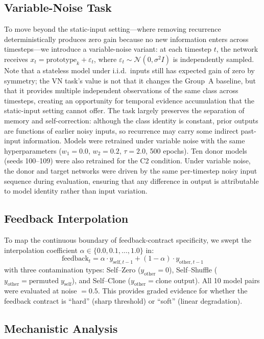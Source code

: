 \documentclass[10pt]{article}
\begin{document}
\subsection{Variable-Noise Task}
\label{sec:vn}

To move beyond the static-input setting---where removing recurrence deterministically produces zero gain because no new information enters across timesteps---we introduce a variable-noise variant: at each timestep $t$, the network receives $x_t = \text{prototype}_k + \varepsilon_t$, where $\varepsilon_t \sim \mathcal{N}(0, \sigma^2 I)$ is independently sampled. Note that a stateless model under i.i.d.\ inputs still has expected gain of zero by symmetry; the VN task's value is not that it changes the Group~A baseline, but that it provides multiple independent observations of the same class across timesteps, creating an opportunity for temporal evidence accumulation that the static-input setting cannot offer. The task largely preserves the separation of memory and self-correction: although the class identity is constant, prior outputs are functions of earlier noisy inputs, so recurrence may carry some indirect past-input information. Models were retrained under variable noise with the same hyperparameters ($w_1{=}0.0$, $w_2{=}0.2$, $\tau{=}2.0$, 500 epochs). Ten donor models (seeds 100--109) were also retrained for the C2 condition. Under variable noise, the donor and target networks were driven by the same per-timestep noisy input sequence during evaluation, ensuring that any difference in output is attributable to model identity rather than input variation.

\subsection{Feedback Interpolation}
\label{sec:interpolation}

To map the continuous boundary of feedback-contract specificity, we swept the interpolation coefficient $\alpha \in \{0.0, 0.1, \ldots, 1.0\}$ in:
\[
\text{feedback}_t = \alpha \cdot y_{\text{self},t-1} + (1-\alpha) \cdot y_{\text{other},t-1}
\]
with three contamination types: Self--Zero ($y_\text{other} = 0$), Self--Shuffle ($y_\text{other} = \text{permuted}\; y_\text{self}$), and Self--Clone ($y_\text{other} = \text{clone output}$). All 10 model pairs were evaluated at noise $= 0.5$. This provides graded evidence for whether the feedback contract is ``hard'' (sharp threshold) or ``soft'' (linear degradation).

\subsection{Mechanistic Analysis}
\label{sec:mechanistic}
\end{document}
